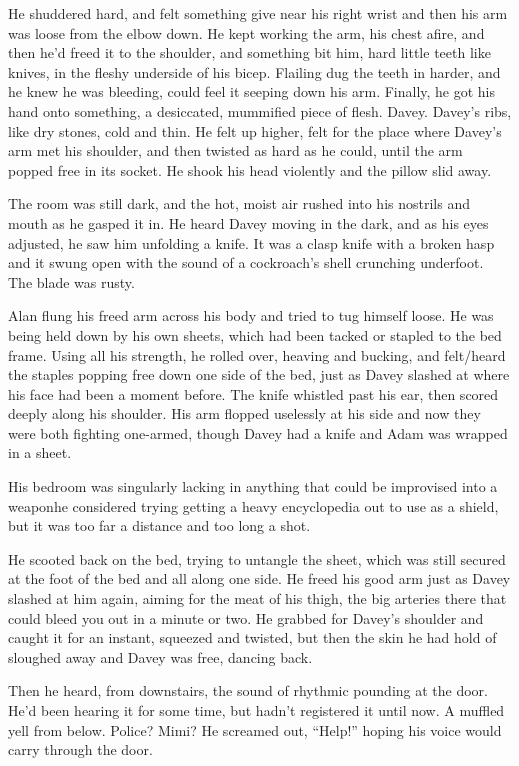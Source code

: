 He shuddered hard, and felt something give near his right wrist and
then his arm was loose from the elbow down.  He kept working the arm,
his chest afire, and then he'd freed it to the shoulder, and something
bit him, hard little teeth like knives, in the fleshy underside of his
bicep.  Flailing dug the teeth in harder, and he knew he was bleeding,
could feel it seeping down his arm.  Finally, he got his hand onto
something, a desiccated, mummified piece of flesh.  Davey.  Davey's
ribs, like dry stones, cold and thin.  He felt up higher, felt for the
place where Davey's arm met his shoulder, and then twisted as hard as
he could, until the arm popped free in its socket.  He shook his head
violently and the pillow slid away.

The room was still dark, and the hot, moist air rushed into his
nostrils and mouth as he gasped it in.  He heard Davey moving in the
dark, and as his eyes adjusted, he saw him unfolding a knife.  It was
a clasp knife with a broken hasp and it swung open with the sound of a
cockroach's shell crunching underfoot.  The blade was rusty.

Alan flung his freed arm across his body and tried to tug himself
loose.  He was being held down by his own sheets, which had been
tacked or stapled to the bed frame.  Using all his strength, he rolled
over, heaving and bucking, and felt/heard the staples popping free
down one side of the bed, just as Davey slashed at where his face had
been a moment before.  The knife whistled past his ear, then scored
deeply along his shoulder.  His arm flopped uselessly at his side and
now they were both fighting one-armed, though Davey had a knife and
Adam was wrapped in a sheet.

His bedroom was singularly lacking in anything that could be
improvised into a weapon\dash{}he considered trying getting a heavy
encyclopedia out to use as a shield, but it was too far a distance and
too long a shot.

He scooted back on the bed, trying to untangle the sheet, which was
still secured at the foot of the bed and all along one side.  He freed
his good arm just as Davey slashed at him again, aiming for the meat
of his thigh, the big arteries there that could bleed you out in a
minute or two.  He grabbed for Davey's shoulder and caught it for an
instant, squeezed and twisted, but then the skin he had hold of
sloughed away and Davey was free, dancing back.

Then he heard, from downstairs, the sound of rhythmic pounding at the
door.  He'd been hearing it for some time, but hadn't registered it
until now.  A muffled yell from below.  Police?  Mimi?  He screamed
out, ``Help!'' hoping his voice would carry through the door.

